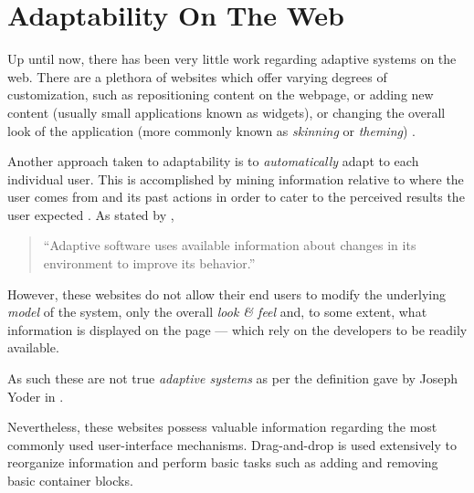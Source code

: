 \section{Adaptability On The Web}\label{sec:web_adaptability}

Up until now, there has been very little work regarding adaptive systems on the web. There are a plethora of websites which offer varying degrees of customization, such as repositioning content on the webpage, or adding new content (usually small applications known as widgets), or changing the overall look of the application (more commonly known as \emph{skinning} or \emph{theming}) \cite{igoogle, pageflakes, protopage, webwag}.

Another approach taken to adaptability is to \emph{automatically} adapt to each individual user. This is accomplished by mining information relative to where the user comes from and its past actions in order to cater to the perceived results the user expected \cite{GGGR09}. As stated by \cite{NC}, 

\begin{quote}
  ``Adaptive software uses available information about changes in its environment to improve its behavior.''
\end{quote}

However, these websites do not allow their end users to modify the underlying \emph{model} of the system, only the overall \emph{look \& feel} and, to some extent, what information is displayed on the page --- which rely on the developers to be readily available.

As such these are not true \emph{adaptive systems} as per the definition gave by Joseph Yoder in \cite{YJ02}.

Nevertheless, these websites possess valuable information regarding the most commonly used user-interface mechanisms. Drag-and-drop is used extensively to reorganize information and perform basic tasks such as adding and removing basic container blocks.
